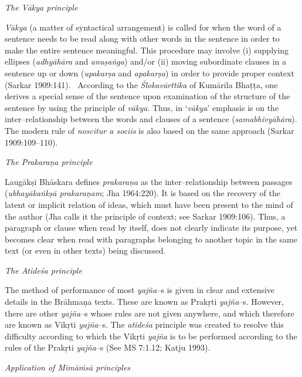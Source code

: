 \textit{The Vākya principle}

\textit{Vākya} (a matter of syntactical arrangement) is called for when the word of a sentence needs to be read along with other words in the sentence in order to make the entire sentence meaningful. This procedure may involve (i) supplying ellipses (\textit{adhyāhāra} and \textit{anuṣaṅga}) and/or (ii) moving subordinate clauses in a sentence up or down (\textit{upakarṣa} and \textit{apakarṣa}) in order to provide proper context (Sarkar 1909:141).  According to the \textit{Ślokavārttika} of Kumārila Bhaṭṭa, one derives a special sense of the sentence upon examination of the structure of the sentence by using the principle of \textit{vākya}. Thus, in ‘\textit{vākya}’ emphasis is on the inter–relationship between the words and clauses of a sentence (\textit{samabhivyāhāra}). The modern rule of \textit{noscitur a sociis} is also based on the same approach (Sarkar 1909:109–110).

\textit{The Prakaraṇa principle}

Laugākṣī Bhāskara defines \textit{prakaraṇa} as the inter–relationship between passages (\textit{ubhayākaṅkṣā prakaraṇam}; Jha 1964:220). It is based on the recovery of the latent or implicit relation of ideas, which must have been present to the mind of the author (Jha calls it the principle of context; see Sarkar 1909:106). Thus, a paragraph or clause when read by itself, does not clearly indicate its purpose, yet becomes clear when read with paragraphs belonging to another topic in the same text (or even in other texts) being discussed.

\textit{The Atideśa principle}

The method of performance of most \textit{yajña–}s is given in clear and extensive details in the Brāhmaṇa texts. These are known as Prakṛti \textit{yajña}–s. However, there are other \textit{yajña–}s whose rules are not given anywhere, and which therefore are known as Vikṛti \textit{yajña}–s. The \textit{atideśa} principle was created to resolve this difficulty according to which the Vikṛti \textit{yajña} is to be performed according to the rules of the Prakṛti \textit{yajña}–s (See MS 7:1.12; Katju 1993).

\textit{Application of Mīmāṁsā principles}

